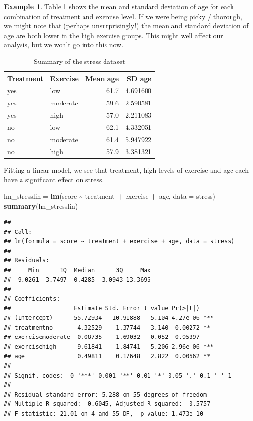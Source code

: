 \documentclass[
  openany]{book}
\newenvironment{Shaded}{\begin{snugshade}}{\end{snugshade}}
\newcommand{\AttributeTok}[1]{\textcolor[rgb]{0.13,0.29,0.53}{#1}}
\newcommand{\FunctionTok}[1]{\textcolor[rgb]{0.13,0.29,0.53}{\textbf{#1}}}
\newcommand{\NormalTok}[1]{#1}
\newcommand{\OtherTok}[1]{\textcolor[rgb]{0.56,0.35,0.01}{#1}}
\newcommand{\SpecialCharTok}[1]{\textcolor[rgb]{0.81,0.36,0.00}{\textbf{#1}}}
\theoremstyle{definition}
\theoremstyle{definition}
\newtheorem{example}{Example}[chapter]
\theoremstyle{definition}
\theoremstyle{definition}
\theoremstyle{remark}
\begin{document}
\begin{example}
Table \ref{tab:sumstress} shows the mean and standard deviation of age for each combination of treatment and exercise level. If we were being picky / thorough, we might note that (perhaps unsurprisingly!) the mean and standard deviation of age are both lower in the high exercise groups. This might well affect our analysis, but we won't go into this now.

\begin{table}

\caption{\label{tab:sumstress}Summary of the stress dataset}
\centering
\begin{tabular}[t]{l|l|r|r}
\hline
Treatment & Exercise & Mean age & SD age\\
\hline
yes & low & 61.7 & 4.691600\\
\hline
yes & moderate & 59.6 & 2.590581\\
\hline
yes & high & 57.0 & 2.211083\\
\hline
no & low & 62.1 & 4.332051\\
\hline
no & moderate & 61.4 & 5.947922\\
\hline
no & high & 57.9 & 3.381321\\
\hline
\end{tabular}
\end{table}

Fitting a linear model, we see that treatment, high levels of exercise and age each have a significant effect on stress.

\begin{Shaded}
\begin{Highlighting}[]
\NormalTok{lm\_stresslin }\OtherTok{=} \FunctionTok{lm}\NormalTok{(score }\SpecialCharTok{\textasciitilde{}}\NormalTok{ treatment }\SpecialCharTok{+}\NormalTok{ exercise }\SpecialCharTok{+}\NormalTok{ age, }\AttributeTok{data =}\NormalTok{ stress)}
\FunctionTok{summary}\NormalTok{(lm\_stresslin)}
\end{Highlighting}
\end{Shaded}

\begin{verbatim}
## 
## Call:
## lm(formula = score ~ treatment + exercise + age, data = stress)
## 
## Residuals:
##     Min      1Q  Median      3Q     Max 
## -9.0261 -3.7497 -0.4285  3.0943 13.3696 
## 
## Coefficients:
##                  Estimate Std. Error t value Pr(>|t|)    
## (Intercept)      55.72934   10.91888   5.104 4.27e-06 ***
## treatmentno       4.32529    1.37744   3.140  0.00272 ** 
## exercisemoderate  0.08735    1.69032   0.052  0.95897    
## exercisehigh     -9.61841    1.84741  -5.206 2.96e-06 ***
## age               0.49811    0.17648   2.822  0.00662 ** 
## ---
## Signif. codes:  0 '***' 0.001 '**' 0.01 '*' 0.05 '.' 0.1 ' ' 1
## 
## Residual standard error: 5.288 on 55 degrees of freedom
## Multiple R-squared:  0.6045, Adjusted R-squared:  0.5757 
## F-statistic: 21.01 on 4 and 55 DF,  p-value: 1.473e-10
\end{verbatim}


\end{example}
\end{document}
